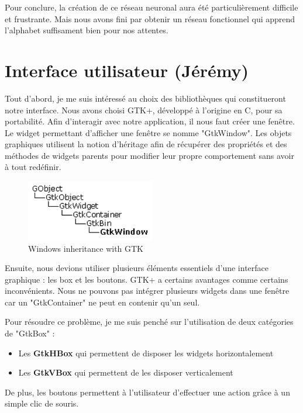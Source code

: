 \documentclass[12pt]{report}
\begin{document}
\newpage

Pour conclure, la création de ce réseau neuronal aura été particulièrement difficile et frustrante. Mais nous avons fini par obtenir un réseau fonctionnel qui apprend l'alphabet suffisament bien pour nos attentes. 

\section{Interface utilisateur (Jérémy)}

Tout d’abord, je me suis intéressé au choix des bibliothèques qui constitueront notre interface. Nous avons choisi GTK+, développé à l’origine en C, pour sa portabilité. Afin d’interagir avec notre application, il nous faut créer une fenêtre. Le widget permettant d’afficher une fenêtre se nomme "GtkWindow". Les objets graphiques utilisent la notion d’héritage afin de récupérer des propriétés et des méthodes de widgets parents pour modifier leur propre comportement sans avoir à tout redéfinir. 

\begin{figure}[H]
    \centering
    \includegraphics[width=0.5\textwidth]{GTK1}
    \caption{Windows inheritance with GTK}
\end{figure}

Ensuite, nous devions utiliser plusieurs éléments essentiels d’une interface graphique : les box et les boutons. GTK+ a certains avantages comme certains inconvénients. Nous ne pouvons pas intégrer plusieurs widgets dans une fenêtre car un "GtkContainer" ne peut en contenir qu’un seul. 

Pour résoudre ce problème, je me suis penché sur l’utilisation de deux catégories de "GtkBox" :

\begin{itemize}[label=\textbullet]
	\item Les \textbf{GtkHBox} qui permettent de disposer les widgets horizontalement
	\item Les \textbf{GtkVBox} qui permettent de les disposer verticalement
\end{itemize}

De plus, les boutons permettent à l’utilisateur d’effectuer une action grâce à un simple clic de souris. 
\end{document}
